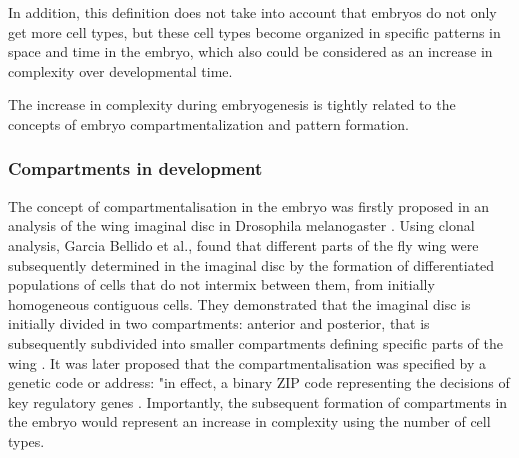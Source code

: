 In addition, this definition does not take into account that embryos do not only get more cell types, but these cell types become organized in specific patterns in space and time in the embryo, which also could be considered as an increase in complexity over developmental time.

The increase in complexity during embryogenesis is tightly related to the concepts of embryo compartmentalization and pattern formation.

\subsubsection{Compartments in development}
The concept of compartmentalisation in the embryo was firstly proposed in an analysis of the wing imaginal disc in Drosophila melanogaster \citep{Garcia-Bellido1973}.
Using clonal analysis, Garcia Bellido et al., found that different parts of the fly wing were subsequently determined in the imaginal disc by the formation of differentiated populations of cells that do not intermix between them, from initially homogeneous contiguous cells.
They demonstrated that the imaginal disc is initially divided in two compartments: anterior and posterior, that is subsequently subdivided into smaller compartments defining specific parts of the wing \citep{Garcia-Bellido1973}. It was later proposed that the compartmentalisation was specified by a genetic code or address: "in effect, a binary ZIP code representing the decisions of key regulatory genes \citep{Garcia-Bellido1979}.
Importantly, the subsequent formation of compartments in the embryo would represent an increase in complexity using the number of cell types.


